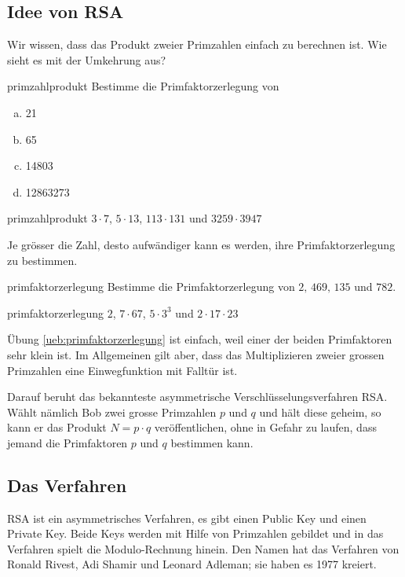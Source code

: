 \documentclass[%
<<<<<<< Updated upstream
11pt,%
twoside,%
titlepage,%
german,%
headsepline%
]{scrartcl}
\begin{document}
\subsection{Idee von RSA}

Wir wissen, dass das Produkt zweier Primzahlen einfach zu berechnen ist. Wie sieht es mit der Umkehrung aus?

\begin{uebenv}{primzahlprodukt}
Bestimme die Primfaktorzerlegung von

\begin{enumerate}[a)]
\item 21
\item 65
\item 14803
\item 12863273
\end{enumerate}
\end{uebenv}

\begin{lsg}{primzahlprodukt}
    $3\cdot7$, $5\cdot13$, $113\cdot131$ und $3259\cdot3947$
\end{lsg}

Je grösser die Zahl, desto aufwändiger kann es werden, ihre Primfaktorzerlegung zu bestimmen.

\begin{uebenv}{primfaktorzerlegung}
Bestimme die Primfaktorzerlegung von $2,\,469,\,135$ und $782$.
\end{uebenv}

\begin{lsg}{primfaktorzerlegung}
    $2$, $7\cdot 67$, $5\cdot 3^3$ und $2\cdot17\cdot23$
\end{lsg}

Übung \ref{ueb:primfaktorzerlegung} ist einfach, weil einer der beiden Primfaktoren sehr klein ist. Im Allgemeinen gilt aber, dass das Multiplizieren zweier grossen Primzahlen eine Einwegfunktion mit Falltür ist.

Darauf beruht das bekannteste asymmetrische Verschlüsselungsverfahren RSA. Wählt nämlich Bob zwei grosse Primzahlen $p$ und $q$ und hält diese geheim, so kann er das Produkt $N=p\cdot q$ veröffentlichen, ohne in Gefahr zu laufen, dass jemand die Primfaktoren $p$ und $q$ bestimmen kann.

\subsection{Das Verfahren}

RSA ist ein asymmetrisches Verfahren, es gibt einen Public Key und einen Private Key. Beide Keys werden mit Hilfe von Primzahlen gebildet und in das Verfahren spielt die Modulo-Rechnung hinein. Den Namen hat das Verfahren von Ronald Rivest, Adi Shamir und Leonard Adleman; sie haben es 1977 kreiert.
\end{document}
